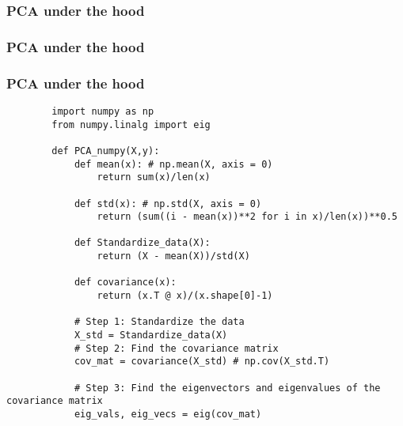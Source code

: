 \documentclass{beamer}
\begin{document}
    \subsubsection{PCA under the hood}
    \begin{frame}
        \begin{center}
        \frametitle{PCA under the hood}
        \end{center}
    \end{frame}

    \begin{frame}[fragile]
        \frametitle{PCA under the hood}
        \begin{center}
        \scriptsize
        \begin{verbatim}
        import numpy as np
        from numpy.linalg import eig

        def PCA_numpy(X,y):
            def mean(x): # np.mean(X, axis = 0)  
                return sum(x)/len(x)  

            def std(x): # np.std(X, axis = 0)
                return (sum((i - mean(x))**2 for i in x)/len(x))**0.5

            def Standardize_data(X):
                return (X - mean(X))/std(X)

            def covariance(x): 
                return (x.T @ x)/(x.shape[0]-1)

            # Step 1: Standardize the data
            X_std = Standardize_data(X)
            # Step 2: Find the covariance matrix
            cov_mat = covariance(X_std) # np.cov(X_std.T)

            # Step 3: Find the eigenvectors and eigenvalues of the covariance matrix
            eig_vals, eig_vecs = eig(cov_mat) 

        \end{verbatim}
        \end{center}
    \end{frame}
\end{document}
